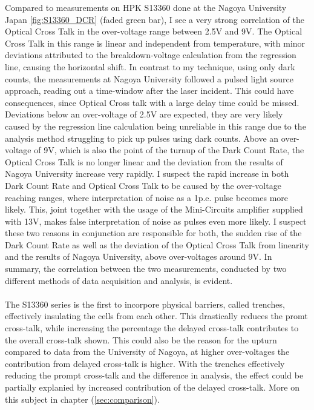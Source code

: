 \documentclass[12pt,article,type=msc,colorback,accentcolor=tud9c]{tudthesis}
\begin{document}
Compared to measurements on HPK S13360 done at the Nagoya University Japan \ref{fig:S13360_DCR} (faded green bar), I see a very strong correlation of the Optical Cross Talk in the over-voltage range between 2.5V and 9V. The Optical Cross Talk in this range is linear and independent from temperature, with minor deviations attributed to the breakdown-voltage calculation from the regression line, causing the horizontal shift. In contrast to my technique, using only dark counts, the measurements at Nagoya University followed a pulsed light source approach, reading out a time-window after the laser incident. This could have consequences, since Optical Cross talk with a large delay time could be missed. Deviations below an over-voltage of 2.5V are expected, they are very likely caused by the regression line calculation being unreliable in this range due to the analysis method struggling to pick up pulses using dark counts. Above an over-voltage of 9V, which is also the point of the turnup of the Dark Count Rate, the Optical Cross Talk is no longer linear and the deviation from the results of Nagoya University increase very rapidly. I suspect the rapid increase in both Dark Count Rate and Optical Cross Talk to be caused by the over-voltage reaching ranges, where interpretation of noise as a 1p.e. pulse becomes more likely. This, joint together with the usage of the Mini-Circuits amplifier supplied with 13V, makes false interpretation of noise as pulses even more likely. I suspect these two reasons in conjunction are responsible for both, the sudden rise of the Dark Count Rate as well as the deviation of the Optical Cross Talk from linearity and the results of Nagoya University, above over-voltages around 9V. In summary, the correlation between the two measurements, conducted by two different methods of data acquisition and analysis, is evident.\\\\

The S13360 series is the first to incorpore physical barriers, called trenches, effectively insulating the cells from each other. This drastically reduces the promt cross-talk, while increasing the percentage the delayed cross-talk contributes to the overall cross-talk shown. This could also be the reason for the upturn compared to data from the University of Nagoya, at higher over-voltages the contribution from delayed cross-talk is higher. With the trenches effectively reducing the prompt cross-talk and the difference in analysis, the effect could be partially explanied by increased contribution of the delayed cross-talk. More on this subject in chapter (\ref{sec:comparison}).
\end{document}
